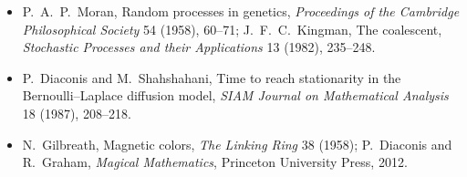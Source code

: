 \begin{itemize}
Y.~Peres, J.~Rosen and O.~Zeitouni, Cover times for Brownian motion and random walks in two dimensions, \emph{Annals of Mathematics} 160
(2004), 433--464.
\item P.~A.~P.~Moran, Random processes in genetics, \emph{Proceedings of the Cambridge Philosophical Society} 54 (1958), 60--71; J.~F.~C.~Kingman,
The coalescent, \emph{Stochastic Processes and their Applications} 13 (1982), 235--248.
\item P.~Diaconis and M.~Shahshahani, Time to reach stationarity in the Bernoulli--Laplace diffusion model, \emph{SIAM Journal on
Mathematical Analysis} 18 (1987), 208--218.
\item N.~Gilbreath, Magnetic colors, \emph{The Linking Ring} 38 (1958); P.~Diaconis and R.~Graham, \emph{Magical Mathematics}, Princeton
University Press, 2012.
\end{itemize}
